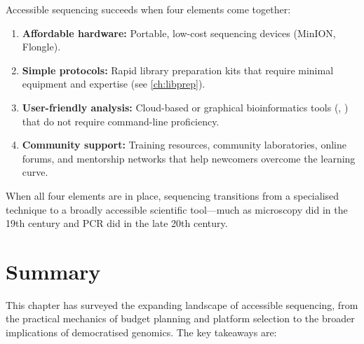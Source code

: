 \begin{keyconcept}[title={The Accessible Sequencing Ecosystem}]
Accessible sequencing succeeds when four elements come together:
\begin{enumerate}[nosep]
  \item \textbf{Affordable hardware:} Portable, low-cost sequencing devices (MinION, Flongle).
  \item \textbf{Simple protocols:} Rapid library preparation kits that require minimal equipment and expertise (see \cref{ch:libprep}).
  \item \textbf{User-friendly analysis:} Cloud-based or graphical bioinformatics tools (, ) that do not require command-line proficiency.
  \item \textbf{Community support:} Training resources, community laboratories, online forums, and mentorship networks that help newcomers overcome the learning curve.
\end{enumerate}
When all four elements are in place, sequencing transitions from a specialised technique to a broadly accessible scientific tool---much as microscopy did in the 19th century and PCR did in the late 20th century.
\end{keyconcept}

\section{Summary}
\label{sec:accessible:summary}

This chapter has surveyed the expanding landscape of accessible sequencing, from the practical mechanics of budget planning and platform selection to the broader implications of democratised genomics. The key takeaways are:


